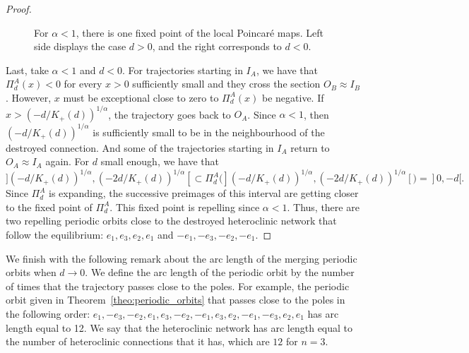 \documentclass{article}
\theoremstyle{definition}
\begin{document}
\begin{proof}
\begin{figure}
\caption{For $\alpha<1$, there is one fixed point of the local Poincaré maps. Left side displays the case $d>0$, and the right corresponds to $d<0$.}	
	\label{fig:periodic_orbit_alpha_ls_1_d_neg}
\end{figure}

Last, take $\alpha<1$ and $d<0$.
For trajectories starting in $I_A$, we have that $\Pi^{A}_{d}(x)<0$ for every $x>0$ sufficiently small and they cross the section $O_B\approx I_B$.
However, $x$ must be exceptional close to zero to $\Pi^{A}_{d}(x)$ be negative.
If $x>(-d/K_+(d))^{1/\alpha}$, the trajectory goes back to $O_A$. 
Since $\alpha<1$, then $(-d/K_+(d))^{1/\alpha}$ is sufficiently small to be in the neighbourhood of the destroyed connection.
And some of the trajectories starting in $I_A$ return to $O_A\approx I_A$ again.
For $d$ small enough, we have that 
$$](-d/K_+(d))^{1/\alpha}, (-2d/K_+(d))^{1/\alpha}[\subset \Pi^{A}_{d}(](-d/K_+(d))^{1/\alpha}, (-2d/K_+(d))^{1/\alpha}[)=]0,-d[.$$
Since $\Pi^{A}_{d}$ is expanding, the successive preimages of this interval are getting closer to the fixed point of $\Pi^{A}_{d}$.
This fixed point is repelling since $\alpha<1$.
Thus, there are two repelling periodic orbits close to the destroyed heteroclinic network that follow the equilibrium: $e_1, e_3,e_2,e_1$ and $-e_1, -e_3,-e_2,-e_1$.
\end{proof}



We finish with the following remark about the arc length of the merging periodic orbits when $d\to 0$. 
We define the arc length of the periodic orbit by the number of times that the trajectory passes close to the poles.
For example, the periodic orbit given in Theorem~\ref{theo:periodic_orbits} that passes close to the poles in the following order: $e_1, -e_3, -e_2, e_1,e_3, -e_2, -e_1, e_3, e_2, -e_1, -e_3, e_2, e_1$ has arc length equal to 12. 
We say that the heteroclinic network has arc length equal to the number of heteroclinic connections that it has, which are $12$ for $n=3$.
\end{document}
